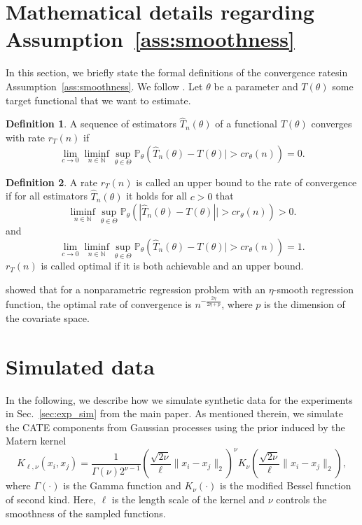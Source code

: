 \documentclass{article} %
\newcommand{\N}{\mathbb{N}}
\theoremstyle{definition}
\newtheorem{definition}{Definition}
\theoremstyle{plain}
\begin{document}
\section{Mathematical details regarding Assumption~\ref{ass:smoothness}}\label{app:rates}
In this section, we briefly state the formal definitions of the convergence ratesin Assumption~\ref{ass:smoothness}. We follow \citet{Stone.1980}. Let $\theta$ be a parameter and $T(\theta)$ some target functional that we want to estimate.
\begin{definition}
A sequence of estimators $\hat{T}_n(\theta)$ of a functional $T(\theta)$ converges with rate $r_{T}(n)$ if
\begin{equation}
   \lim_{c \to 0} \liminf_{n \in \N} \sup_{\theta \in \Theta} \mathbb{P}_\theta( \hat{T}_n(\theta) - T(\theta)| > c r_{\theta}(n)) = 0. 
\end{equation}
\end{definition}
\begin{definition}
A rate $r_{T}(n)$ is called an upper bound to the rate of convergence if for all estimators $\hat{T}_n(\theta)$ it holds for all $c > 0$ that
\begin{equation}
    \liminf_{n \in \N} \sup_{\theta \in \Theta} \mathbb{P}_\theta( |\hat{T}_n(\theta) - T(\theta)|| > c r_{\theta}(n)) > 0. 
\end{equation}
and \begin{equation}
   \lim_{c \to 0} \liminf_{n \in \N} \sup_{\theta \in \Theta} \mathbb{P}_\theta( \hat{T}_n(\theta) - T(\theta)| > c r_{\theta}(n)) = 1. 
\end{equation}
$r_{T}(n)$ is called optimal if it is both achievable and an upper bound.
\end{definition}
\citet{Stone.1980} showed that for a nonparametric regression problem with an $\eta$-smooth regression function, the optimal rate of convergence is $n^{-\frac{2\eta}{2\eta + p}}$, where $p$ is the dimension of the covariate space.


\clearpage

\section{Simulated data}\label{app:sim}

In the following, we describe how we simulate synthetic data for the experiments in Sec.~\ref{sec:exp_sim} from the main paper. As mentioned therein, we simulate the CATE components from Gaussian processes using the prior induced by the Matern kernel \citep{Rasmussen.2008}
\begin{equation}
    K_{\ell, \nu}(x_i, x_j) = \frac{1}{\Gamma(\nu)2^{\nu-1}}\left( \frac{\sqrt{2\nu}}{\ell} \| x_i - x_j\|_2  \right)^\nu K_\nu \left(\frac{\sqrt{2\nu}}{\ell} \| x_i - x_j\|_2 \right),
\end{equation}
where $\Gamma(\cdot)$ is the Gamma function and $K_\nu(\cdot)$ is the modified Bessel function of second kind. Here, $\ell$ is the length scale of the kernel and $\nu$ controls the smoothness of the sampled functions. 
\end{document}
